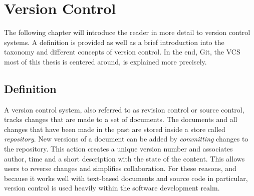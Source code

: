 \chapter{Version Control} \label{chapter:version-control}
The following chapter will introduce the reader in more detail to version control systems. A definition is provided as well as a brief introduction into the taxonomy and different concepts of version control. In the end, Git, the VCS most of this thesis is centered around, is explained more precisely.

\section{Definition}
A version control system, also referred to as revision control or source control, tracks changes that are made to a set of documents. The documents and all changes that have been made in the past are stored inside a store called  \textit{repository}. New versions of a document can be added by \textit{committing} changes to the repository. This action creates a unique version number and associates author, time and a short description with the state of the content. This allows users to reverse changes and simplifies collaboration. For these reasons, and because it works well with text-based documents and source code in particular, version control is used heavily within the software development realm.



